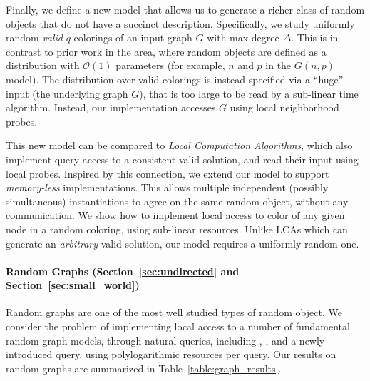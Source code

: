 
Finally, we define a new model that allows us to generate a richer class of random objects that do not have a succinct description.
Specifically, we study uniformly random \emph{valid} $q$-colorings of an input graph $G$ with max degree $\Delta$.
This is in contrast to prior work in the area, where random objects are defined as a distribution with $\mathcal O(1)$ parameters
(for example, $n$ and $p$ in the $G(n,p)$ model).
The distribution over valid colorings is instead specified via a ``huge'' input (the underlying graph $G$),
that is too large to be read by a sub-linear time algorithm.
Instead, our implementation accesses $G$ using local neighborhood probes.

This new model can be compared to \emph{Local Computation Algorithms}, which also implement query access to a consistent valid solution,
and read their input using local probes.
Inspired by this connection, we extend our model to support \emph{memory-less} implementations.
This allows multiple independent (possibly simultaneous) instantiations to agree on the same random object, without any communication.
We show how to implement local access to color of any given node in a random coloring, using sub-linear resources.
Unlike LCAs which can generate an \emph{arbitrary} valid solution, our model requires a uniformly random one.





\paragraph*{Random Graphs (Section~\ref{sec:undirected} and Section~\ref{sec:small_world})}%
\label{par:random_graphs}
Random graphs are one of the most well studied types of random object.
We consider the problem of implementing local access to a number of fundamental random graph models,
through natural queries, including , ,
and a newly introduced  query, using polylogarithmic resources per query.
Our results on random graphs are summarized in Table~\ref{table:graph_results}.

